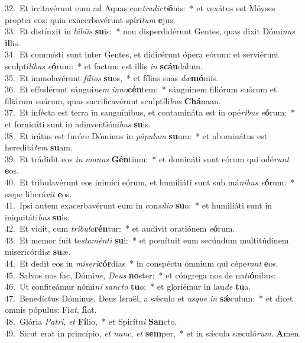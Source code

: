 {32.~}Et irritavérunt eum ad Aquas con\textit{tra}\textit{di}\textit{cti}\textbf{ó}nis:~* et vexátus est Móyses propter eos: quia exacerbavérunt spíri\textit{tum} \textbf{e}jus.\\
{33.~}Et distínxit in \textit{lá}\textit{bi}\textit{is} \textbf{su}is:~* non disperdidérunt Gentes, quas dixit Dómi\textit{nus} \textbf{il}lis.\\
{34.~}Et commísti sunt inter Gentes, et didicérunt ópera eórum: et serviérunt sculptí\textit{li}\textit{bus} \textit{e}\textbf{ó}rum:~* et factum est illis \textit{in} \textbf{scán}dalum.\\
{35.~}Et immolavérunt \textit{fí}\textit{li}\textit{os} \textbf{su}os,~* et fílias suas \textit{dæ}\textbf{mó}niis.\\
{36.~}Et effudérunt sángui\textit{nem} \textit{in}\textit{no}\textbf{cén}tem:~* sánguinem filiórum suórum et filiárum suárum, quas sacrificavérunt sculptíli\textit{bus} \textbf{Chá}naan.\\
{37.~}Et infécta est terra in sanguínibus, et contamináta est in opé\textit{ri}\textit{bus} \textit{e}\textbf{ó}rum:~* et fornicáti sunt in adinventióni\textit{bus} \textbf{su}is.\\
{38.~}Et irátus est furóre Dóminus in \textit{pó}\textit{pu}\textit{lum} \textbf{su}um:~* et abominátus est hereditá\textit{tem} \textbf{su}am.\\
{39.~}Et trádidit eos \textit{in} \textit{ma}\textit{nus} \textbf{Gén}tium:~* et domináti sunt eórum qui odé\textit{runt} \textbf{e}os.\\
{40.~}Et tribulavérunt eos inimíci eórum, et humiliáti sunt sub má\textit{ni}\textit{bus} \textit{e}\textbf{ó}rum:~* sæpe liberá\textit{vit} \textbf{e}os.\\
{41.~}Ipsi autem exacerbavérunt eum in con\textit{sí}\textit{li}\textit{o} \textbf{su}o:~* et humiliáti sunt in iniquitáti\textit{bus} \textbf{su}is.\\
{42.~}Et vidit, cum \textit{tri}\textit{bu}\textit{la}\textbf{rén}tur:~* et audívit oratiónem \textit{e}\textbf{ó}rum.\\
{43.~}Et memor fuit te\textit{sta}\textit{mén}\textit{ti} \textbf{su}i:~* et pœnítuit eum secúndum multitúdinem misericórdi\textit{æ} \textbf{su}æ.\\
{44.~}Et dedit eos in \textit{mi}\textit{se}\textit{ri}\textbf{cór}dias~* in conspéctu ómnium qui cépe\textit{rant} \textbf{e}os.\\
{45.~}Salvos nos fac, Dómi\textit{ne}, \textit{De}\textit{us} \textbf{no}ster:~* et cóngrega nos de na\textit{ti}\textbf{ó}nibus:\\
{46.~}Ut confiteámur nómi\textit{ni} \textit{san}\textit{cto} \textbf{tu}o:~* et gloriémur in lau\textit{de} \textbf{tu}a.\\
{47.~}Benedíctus Dóminus, Deus Israël, a sǽculo et \textit{us}\textit{que} \textit{in} \textbf{sǽ}culum:~* et dicet omnis pópulus: Fi\textit{at}, \textbf{fi}at.\\
{48.~}Glória \textit{Pa}\textit{tri}, \textit{et} \textbf{Fí}lio,~* et Spirítu\textit{i} \textbf{San}cto.\\
{49.~}Sicut erat in princípio, \textit{et} \textit{nunc}, \textit{et} \textbf{sem}per,~* et in sǽcula sæculó\textit{rum}. \textbf{A}men.\\
